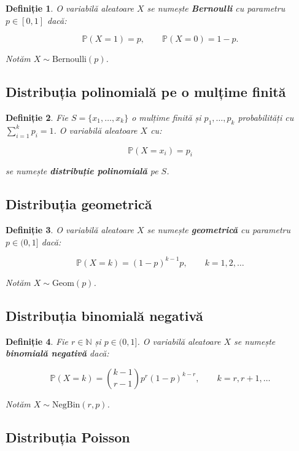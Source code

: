 \documentclass[12pt]{article}
\theoremstyle{plain}
\newtheorem{definition}{Definiție}
\begin{document}
\begin{definition}
O variabilă aleatoare $X$ se numește \textbf{Bernoulli} cu parametru $p \in [0,1]$ dacă:


\[
\mathbb{P}(X = 1) = p, \qquad \mathbb{P}(X = 0) = 1 - p.
\]


Notăm $X \sim \mathrm{Bernoulli}(p)$.
\end{definition}

\subsection{Distribuția polinomială pe o mulțime finită}

\begin{definition}
Fie $S = \{x_1, \dots, x_k\}$ o mulțime finită și $p_1, \dots, p_k$ probabilități cu
$\sum_{i=1}^k p_i = 1$.
O variabilă aleatoare $X$ cu:


\[
\mathbb{P}(X = x_i) = p_i
\]


se numește \textbf{distribuție polinomială} pe $S$.
\end{definition}

\subsection{Distribuția geometrică}

\begin{definition}
O variabilă aleatoare $X$ se numește \textbf{geometrică} cu parametru $p \in (0,1]$ dacă:


\[
\mathbb{P}(X = k) = (1-p)^{k-1} p, \qquad k = 1,2,\dots
\]


Notăm $X \sim \mathrm{Geom}(p)$.
\end{definition}

\subsection{Distribuția binomială negativă}

\begin{definition}
Fie $r \in \mathbb{N}$ și $p \in (0,1]$.
O variabilă aleatoare $X$ se numește \textbf{binomială negativă} dacă:


\[
\mathbb{P}(X = k) = \binom{k-1}{r-1} p^r (1-p)^{k-r},
\qquad k = r, r+1, \dots
\]


Notăm $X \sim \mathrm{NegBin}(r,p)$.
\end{definition}

\subsection{Distribuția Poisson}
\end{document}
